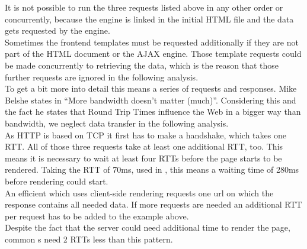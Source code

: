 \noindent{}It is not possible to run the three requests listed above in any other order or concurrently, because the \ajax{} engine is linked in the initial HTML file and the data gets requested by the \ajax{} engine.
\\
Sometimes the frontend templates must be requested additionally if they are not part of the HTML document or the AJAX engine.
Those template requests could be made concurrently to retrieving the data, which is the reason that those further requests are ignored in the following analysis.
\\
To get a bit more into detail this means a series of requests and responses.
Mike Belshe states in \cite{belshe2010more} \enquote{More bandwidth doesn't matter (much)}.
Considering this and the fact he states that Round Trip Times influence the Web in a bigger way than bandwidth, we neglect data transfer in the following analysis.
\\
As HTTP is based on TCP it first has to make a handshake, which takes one RTT.
All of those three requests take at least one additional RTT, too.
This means it is necessary to wait at least four RTTs before the page starts to be rendered.
Taking the RTT of 70ms, used in \cite{spero1994analysis}, this means a waiting time of 280ms before rendering could start.
\\
An efficient \webApplication{} which uses client-side rendering requests one url on which the response contains all needed data.
If more requests are needed an additional RTT per request has to be added to the example above.
\\
Despite the fact that the server could need additional time to render the page, common \httpRequest{}s need 2 RTTs less than this pattern.


